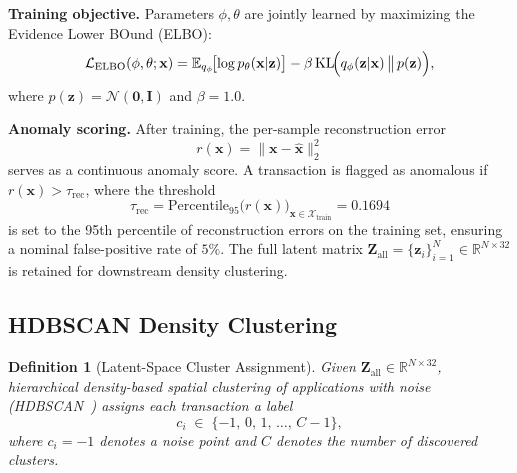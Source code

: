 \documentclass[journal]{IEEEtran}
\newtheorem{definition}{Definition}
\begin{document}
\noindent\textbf{Training objective.}
Parameters $\phi,\theta$ are jointly learned by maximizing the
Evidence Lower BOund (ELBO):
\begin{equation}
  \mathcal{L}_{\mathrm{ELBO}}(\phi,\theta;\mathbf{x})
    = \mathbb{E}_{q_{\phi}}\!\bigl[\log p_{\theta}(\mathbf{x}|\mathbf{z})\bigr]
      - \beta\,\mathrm{KL}\!\Bigl(q_{\phi}(\mathbf{z}|\mathbf{x})
        \,\big\|\,p(\mathbf{z})\Bigr),
  \label{eq:elbo}
\end{equation}
where $p(\mathbf{z})=\mathcal{N}(\mathbf{0},\mathbf{I})$ and $\beta = 1.0$.

\noindent\textbf{Anomaly scoring.}
After training, the per-sample reconstruction error
\begin{equation}
  r(\mathbf{x})
    = \bigl\|\mathbf{x} - \hat{\mathbf{x}}\bigr\|_{2}^{2}
  \label{eq:recon}
\end{equation}
serves as a continuous anomaly score.
A transaction is flagged as anomalous if
$r(\mathbf{x}) > \tau_{\mathrm{rec}}$, where the threshold
\begin{equation}
  \tau_{\mathrm{rec}}
    = \mathrm{Percentile}_{95}\!\bigl(r(\mathbf{x})\bigr)_{\mathbf{x}\in\mathcal{X}_{\mathrm{train}}}
    = 0.1694
  \label{eq:tau_rec}
\end{equation}
is set to the 95th percentile of reconstruction errors on the training set,
ensuring a nominal false-positive rate of $5\%$.
The full latent matrix
$\mathbf{Z}_{\mathrm{all}} = \{\mathbf{z}_{i}\}_{i=1}^{N}
\in\mathbb{R}^{N\times 32}$
is retained for downstream density clustering.

\subsection{HDBSCAN Density Clustering}
\label{subsec:hdbscan}

\begin{definition}[Latent-Space Cluster Assignment]
\label{def:hdbscan}
Given $\mathbf{Z}_{\mathrm{all}}\in\mathbb{R}^{N\times 32}$, hierarchical
density-based spatial clustering of applications with noise
(HDBSCAN~\cite{Campello2013}) assigns each transaction a label
\begin{equation}
  c_{i} \;\in\; \{-1,\,0,\,1,\,\ldots,\,C-1\},
  \label{eq:cluster_label}
\end{equation}
where $c_{i}=-1$ denotes a noise point and $C$ denotes the number of
discovered clusters.
\end{definition}
\end{document}
